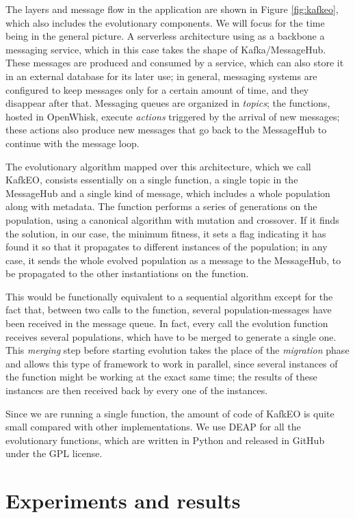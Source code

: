 \documentclass[sigconf]{acmart}
\begin{document}
The layers and message flow in the application are shown in Figure
\ref{fig:kafkeo}, which also includes the evolutionary components. We
will focus for the time being in the general picture. A serverless
architecture using as a backbone a messaging service, which in this case
takes the shape of Kafka/MessageHub. These messages are produced and
consumed by a service, which can also store it in an external database
for its later use; in general, messaging systems are configured to
keep messages only for a certain amount of time, and they disappear
after that. Messaging queues are organized in {\em topics}; the
functions, hosted in OpenWhisk, execute {\em actions} triggered by the
arrival of new messages; these actions also produce new messages that
go back to the MessageHub to continue with the message loop.

The evolutionary algorithm mapped over this architecture, which we
call KafkEO, consists essentially on a single function, a single topic
in the MessageHub and a single kind of message, which includes a whole
population along with metadata. The function performs a series of
generations on the population, using a canonical algorithm with
mutation and crossover. If it finds the solution, in our case, the
minimum fitness, it sets a flag indicating it has found it so that it
propagates to different instances of the population; in any case, it
sends the whole evolved population as a message to the MessageHub, to
be propagated to the other instantiations on the function.

This would be functionally equivalent to a sequential algorithm except
for the fact that, between two calls to the function, several
population-messages have been received in the message queue. In fact,
every call the evolution function receives several populations, which
have to be merged to generate a single one. This {\em merging} step
before starting evolution takes the place of the {\em migration} phase
and allows this type of framework to work in parallel, since several
instances of the function might be working at the exact same time; the
results of these instances are then received back by every one of the
instances.

Since we are running a single function, the amount of code of KafkEO
is quite small compared with other implementations. We use DEAP for
all the evolutionary functions, which are written in Python and
released in GitHub under the GPL license.



\section{Experiments and results}
\label{sec:res}
\end{document}
